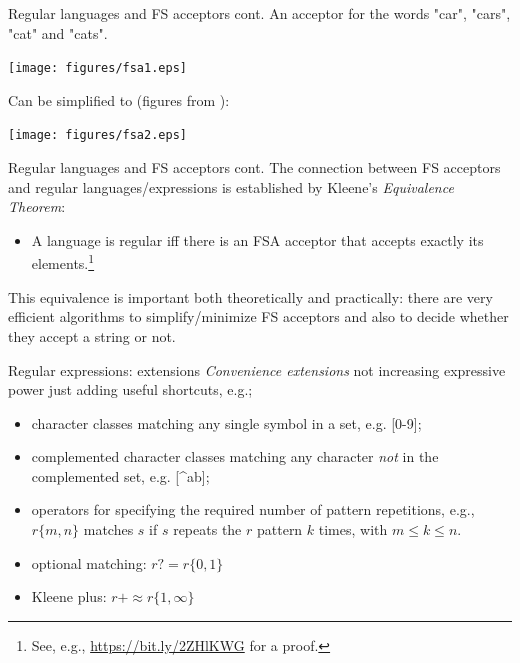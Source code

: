 \documentclass[style=upen, size=14pt]{powerdot}
\newcommand{\gold}{\color{arany}}
\theoremstyle{definition}
\begin{document}
\begin{slide}[toc=]{Regular languages and FS acceptors cont.}
  An acceptor for the words "car", "cars", "cat" and "cats".
  \begin{center}
    \texttt{[image: figures/fsa1.eps]}
  \end{center}
  Can be simplified to (figures from \cite{buutbogel2009fsmorph}):
  \begin{center}
    \texttt{[image: figures/fsa2.eps]}
  \end{center}
\end{slide}

\begin{slide}[toc=]{Regular languages and FS acceptors cont.}
  The connection between FS acceptors and regular languages/expressions is
  established by Kleene's \emph{\gold Equivalence Theorem}:
  \begin{itemize}
  \item A language is regular iff there is an FSA acceptor that accepts exactly
    its elements.\footnote{See, e.g.,
      \href{https://bit.ly/2ZHlKWG}{https://bit.ly/2ZHlKWG} for a proof.}
  \end{itemize}
  This equivalence is important both theoretically and practically: there are
  very efficient algorithms to simplify/minimize FS acceptors and also to decide
  whether they accept a string or not.
\end{slide}

\begin{slide}[toc=]{Regular expressions: extensions}
  \emph{\gold Convenience extensions} not increasing expressive power just adding useful
  shortcuts, e.g.;
  \begin{itemize}
  \item character classes matching any single symbol in a set, e.g. [0-9];
  \item complemented character classes matching any character \emph{not} in the
    complemented set, e.g. [\^{}ab];
  \item operators for specifying the required number of pattern repetitions,
    e.g., $r\{m,n\}$ matches $s$ if $s$ repeats the $r$ pattern $k$ times, with
    $m\leq k \leq n$.
  \item optional matching: $r? = r\{0,1\}$
  \item Kleene plus: $r+ \approx r\{1,\infty\}$
  \end{itemize}
\end{slide}
\end{document}
